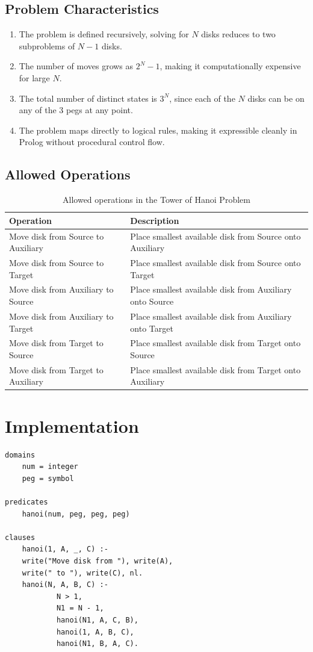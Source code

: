\documentclass[12pt,a4paper]{report}
\begin{document}
\subsection{Problem Characteristics}
\begin{enumerate}
    \item The problem is defined recursively, solving for $N$ disks reduces to two subproblems of $N-1$ disks.
    \item The number of moves grows as $2^N - 1$, making it computationally expensive for large $N$.
    \item The total number of distinct states is $3^N$, since each of the $N$ disks can be on any of the 3 pegs at any point.
    \item The problem maps directly to logical rules, making it expressible cleanly in Prolog without procedural control flow.
\end{enumerate}

\subsection{Allowed Operations}
\begin{table}[H]
\centering
\begin{tabular}{ll}
\toprule
\textbf{Operation} & \textbf{Description} \\
\midrule
Move disk from Source to Auxiliary  & Place smallest available disk from Source onto Auxiliary \\
Move disk from Source to Target     & Place smallest available disk from Source onto Target \\
Move disk from Auxiliary to Source  & Place smallest available disk from Auxiliary onto Source \\
Move disk from Auxiliary to Target  & Place smallest available disk from Auxiliary onto Target \\
Move disk from Target to Source     & Place smallest available disk from Target onto Source \\
Move disk from Target to Auxiliary  & Place smallest available disk from Target onto Auxiliary \\
\bottomrule
\end{tabular}
\caption{Allowed operations in the Tower of Hanoi Problem}
\end{table}

\section{Implementation}
\begin{lstlisting}
domains
    num = integer
    peg = symbol

predicates
    hanoi(num, peg, peg, peg)

clauses
    hanoi(1, A, _, C) :-
    write("Move disk from "), write(A),
    write(" to "), write(C), nl.
    hanoi(N, A, B, C) :-
            N > 1,
            N1 = N - 1,
            hanoi(N1, A, C, B),
            hanoi(1, A, B, C),
            hanoi(N1, B, A, C).
\end{lstlisting}
\end{document}
